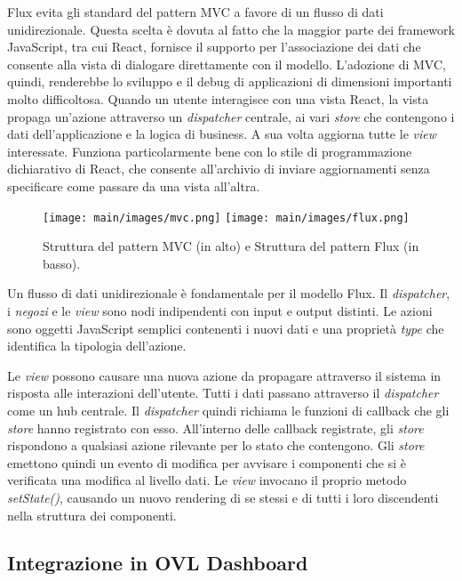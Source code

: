 Flux evita gli standard del pattern MVC a favore di un flusso di dati unidirezionale. Questa scelta è dovuta al fatto che la maggior parte dei framework JavaScript, tra cui React, fornisce il supporto per l'associazione dei dati che consente alla vista di dialogare direttamente con il modello. L'adozione di MVC, quindi, renderebbe lo sviluppo e il debug di applicazioni di dimensioni importanti molto difficoltosa.
Quando un utente interagisce con una vista React, la vista propaga un'azione attraverso un \textit{dispatcher} centrale, ai vari \textit{store} che contengono i dati dell'applicazione e la logica di business. A sua volta aggiorna tutte le \textit{view} interessate. Funziona particolarmente bene con lo stile di programmazione dichiarativo di React, che consente all'archivio di inviare aggiornamenti senza specificare come passare da una vista all'altra.

\begin{figure}
\begin{center}
\texttt{[image: main/images/mvc.png]}
\texttt{[image: main/images/flux.png]}
\end{center}
\caption{Struttura del pattern MVC (in alto) e Struttura del pattern Flux (in basso).}
\label{fig:pattern}
\end{figure}

Un flusso di dati unidirezionale è fondamentale per il modello Flux. Il \textit{dispatcher}, i \textit{negozi} e le \textit{view} sono nodi indipendenti con input e output distinti. Le azioni sono oggetti JavaScript semplici contenenti i nuovi dati e una proprietà \textit{type} che identifica la tipologia dell'azione.

Le \textit{view} possono causare una nuova azione da propagare attraverso il sistema in risposta alle interazioni dell'utente. Tutti i dati passano attraverso il \textit{dispatcher} come un hub centrale.  Il \textit{dispatcher} quindi richiama le funzioni di callback che gli \textit{store} hanno registrato con esso. All'interno delle callback registrate, gli \textit{store} rispondono a qualsiasi azione rilevante per lo stato che contengono. Gli \textit{store} emettono quindi un evento di modifica per avvisare i componenti che si è verificata una modifica al livello dati. Le \textit{view} invocano il proprio metodo \textit{setState()}, causando un nuovo rendering di se stessi e di tutti i loro discendenti nella struttura dei componenti.

\subsection{Integrazione in OVL Dashboard}
\label{sec:integragrazione in OVL Dashboard}

